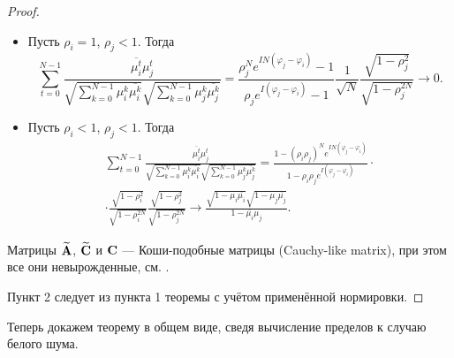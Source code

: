 \documentclass[12pt,a4paper]{article}
\begin{document}
\begin{proof}
\begin{itemize}
			\item Пусть $\rho_i = 1$, $\rho_j < 1$. Тогда
			\begin{equation*}
			\sum_{t=0}^{N-1} \frac{\overline{\mu_i^t} \mu_j^t}{\sqrt{\sum_{k=0}^{N-1} \mu_i^k \overline{\mu_i^k}} \sqrt{\sum_{k=0}^{N-1} \mu_j^k \overline{\mu_j^k}}} = \frac{\rho_j^N e^{I N (\varphi_j -\varphi_i)} - 1}{\rho_j e^{I (\varphi_j - \varphi_i)} - 1}  \frac{1}{\sqrt{N}} \frac{\sqrt{1 - \rho_j^2}}{\sqrt{1 - \rho_j^{2N}}} \to 0.
			\end{equation*}
			
			\item Пусть $\rho_i < 1$, $\rho_j < 1$. Тогда
			\begin{multline*}
			\sum_{t=0}^{N-1} \frac{\overline{\mu_i^t} \mu_j^t}{\sqrt{\sum_{k=0}^{N-1} \mu_i^k \overline{\mu_i^k}} \sqrt{\sum_{k=0}^{N-1} \mu_j^k \overline{\mu_j^k}}} = \frac{1 - (\rho_i \rho_j)^N e^{I N (\varphi_j -\varphi_i)}}{1 - \rho_i \rho_j e^{I (\varphi_j - \varphi_i)}} \cdot \\ \cdot \frac{\sqrt{1 - \rho_i^2}}{\sqrt{1 - \rho_i^{2N}}} \frac{\sqrt{1 - \rho_j^2}}{\sqrt{1 - \rho_j^{2N}}} \to \frac{\sqrt{1 - \mu_{i} \overline{\mu_{i}}}\sqrt{1 - \mu_{j} \overline{\mu_{j}}}}{1 - \overline{\mu_{i}} \mu_{j}}.
			\end{multline*}
				
		\end{itemize}
		
		Матрицы $\widetilde {\mathbf{A}}$, $\widetilde {\mathbf{C}}$ и $\mathbf{C}$ --- Коши-подобные матрицы (Cauchy-like matrix), при этом все они невырожденные, см. \cite{Schechter1959}.
		
		Пункт 2 следует из пункта 1 теоремы с учётом применённой нормировки.
	\end{proof}

Теперь докажем теорему в общем виде, сведя вычисление пределов к случаю белого шума.
\end{document}

